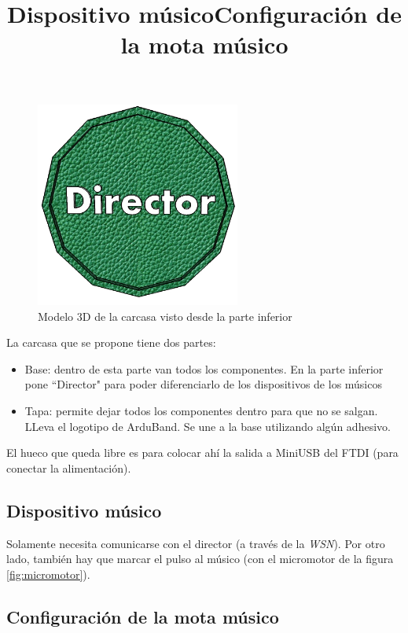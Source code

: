 \begin{figure}[!htb]
\centering
\includegraphics[width=0.6\textwidth]{./imagenes/carcasa_modelo_director_abajo}
\caption{Modelo 3D de la carcasa visto desde la parte inferior} \label{fig:carcasa_inferior}
\end{figure}

La carcasa que se propone tiene dos partes:
\begin{itemize}
  \item Base: dentro de esta parte van todos los componentes. En la parte inferior pone ``Director"
  para poder diferenciarlo de los dispositivos de los músicos
  \item Tapa: permite dejar todos los componentes dentro para que no se salgan. LLeva el logotipo
  de ArduBand. Se une a la base utilizando algún adhesivo.
\end{itemize}

El hueco que queda libre es para colocar ahí la salida a MiniUSB del FTDI (para conectar la alimentación).\\

\subsection{Dispositivo músico}
\title{Dispositivo músico}

Solamente necesita comunicarse con el director (a través de la \textit{WSN}). Por otro lado,
también hay que marcar el pulso al músico (con el micromotor de la figura \ref{fig:micromotor}).

\subsection{Configuración de la mota músico}
\title{Configuración de la mota músico}

